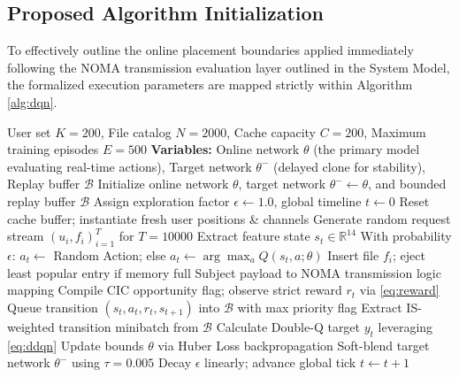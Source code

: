 \documentclass[conference]{IEEEtran}
\begin{document}
\subsection{Proposed Algorithm Initialization}
To effectively outline the online placement boundaries applied immediately following the NOMA transmission evaluation layer outlined in the System Model, the formalized execution parameters are mapped strictly within Algorithm \ref{alg:dqn}.

\begin{algorithm}
\caption{NOMA-Aware Double Dueling DQN Cache Training}
\label{alg:dqn}
\begin{algorithmic}[1]
\REQUIRE User set $K=200$, File catalog $N=2000$, Cache capacity $C=200$, Maximum training episodes $E = 500$
\STATE \textbf{Variables:} Online network $\theta$ (the primary model evaluating real-time actions), Target network $\theta^-$ (delayed clone for stability), Replay buffer $\mathcal{B}$
\STATE Initialize online network $\theta$, target network $\theta^- \leftarrow \theta$, and bounded replay buffer $\mathcal{B}$
\STATE Assign exploration factor $\epsilon \leftarrow 1.0$, global timeline $t \leftarrow 0$
    \STATE Reset cache buffer; instantiate fresh user positions \& channels
    \STATE Generate random request stream $(u_i, f_i)_{i=1}^{T}$ for $T=10000$
        \STATE Extract feature state $s_t \in \mathbb{R}^{14}$
        \STATE With probability $\epsilon$: $a_t \leftarrow$ Random Action; else $a_t \leftarrow \arg\max_a Q(s_t, a; \theta)$
            \STATE Insert file $f_i$; eject least popular entry if memory full
        \ENDIF
        \STATE Subject payload to NOMA transmission logic mapping
        \STATE Compile CIC opportunity flag; observe strict reward $r_t$ via \eqref{eq:reward}
        \STATE Queue transition $(s_t, a_t, r_t, s_{t+1})$ into $\mathcal{B}$ with max priority flag
            \STATE Extract IS-weighted transition minibatch from $\mathcal{B}$
            \STATE Calculate Double-Q target $y_t$ leveraging \eqref{eq:ddqn}
            \STATE Update bounds $\theta$ via Huber Loss backpropagation
            \STATE Soft-blend target network $\theta^-$ using $\tau = 0.005$
        \ENDIF
        \STATE Decay $\epsilon$ linearly; advance global tick $t \leftarrow t + 1$
    \ENDFOR
\ENDFOR
\end{algorithmic}
\end{algorithm}
\end{document}
